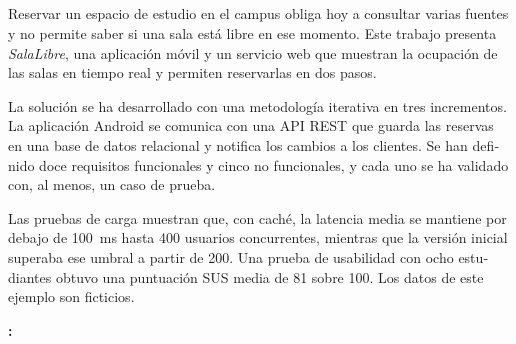 \begin{otherlanguage}{spanish}
\chapter*{\resumenname}

Reservar un espacio de estudio en el campus obliga hoy a consultar varias
fuentes y no permite saber si una sala está libre en ese momento. Este trabajo
presenta \emph{SalaLibre}, una aplicación móvil y un servicio web que muestran
la ocupación de las salas en tiempo real y permiten reservarlas en dos pasos.

La solución se ha desarrollado con una metodología iterativa en tres
incrementos. La aplicación Android se comunica con una API REST que guarda las
reservas en una base de datos relacional y notifica los cambios a los clientes.
Se han definido doce requisitos funcionales y cinco no funcionales, y cada uno
se ha validado con, al menos, un caso de prueba.

Las pruebas de carga muestran que, con caché, la latencia media se mantiene por
debajo de \qty{100}{ms} hasta 400 usuarios concurrentes, mientras que la versión
inicial superaba ese umbral a partir de 200. Una prueba de usabilidad con ocho
estudiantes obtuvo una puntuación SUS media de 81 sobre 100. Los datos de este ejemplo son ficticios.

\vspace{1em}
\noindent\textbf{\clavesname:} \tfgclavesES
\end{otherlanguage}
\cleardoublepage
